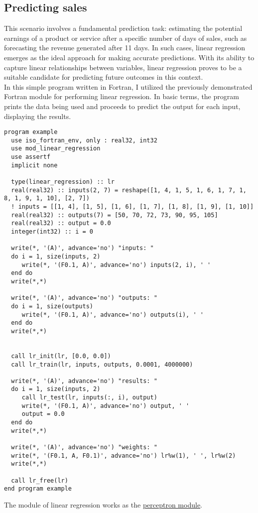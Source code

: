 \subsection{Predicting sales}
This scenario involves a fundamental prediction task: estimating the potential earnings of a product or
service after a specific number of days of sales, such as forecasting the revenue generated after 11 days.
In such cases, linear regression emerges as the ideal approach for making accurate predictions. With its
ability to capture linear relationships between variables, linear regression proves to be a suitable candidate
for predicting future outcomes in this context.\\

In this simple program written in Fortran, I utilized the previously demonstrated Fortran module for performing
linear regression. In basic terms, the program prints the data being used and proceeds to predict the output
for each input, displaying the results.
\begin{lstlisting}
program example
  use iso_fortran_env, only : real32, int32
  use mod_linear_regression
  use assertf
  implicit none

  type(linear_regression) :: lr
  real(real32) :: inputs(2, 7) = reshape([1, 4, 1, 5, 1, 6, 1, 7, 1, 8, 1, 9, 1, 10], [2, 7])
  ! inputs = [[1, 4], [1, 5], [1, 6], [1, 7], [1, 8], [1, 9], [1, 10]]
  real(real32) :: outputs(7) = [50, 70, 72, 73, 90, 95, 105]
  real(real32) :: output = 0.0
  integer(int32) :: i = 0

  write(*, '(A)', advance='no') "inputs: "
  do i = 1, size(inputs, 2)
     write(*, '(F0.1, A)', advance='no') inputs(2, i), ' '
  end do
  write(*,*)

  write(*, '(A)', advance='no') "outputs: "
  do i = 1, size(outputs)
     write(*, '(F0.1, A)', advance='no') outputs(i), ' '
  end do
  write(*,*)
  

  call lr_init(lr, [0.0, 0.0])
  call lr_train(lr, inputs, outputs, 0.0001, 4000000)

  write(*, '(A)', advance='no') "results: "
  do i = 1, size(inputs, 2)
     call lr_test(lr, inputs(:, i), output)
     write(*, '(F0.1, A)', advance='no') output, ' '
     output = 0.0
  end do
  write(*,*)

  write(*, '(A)', advance='no') "weights: "
  write(*, '(F0.1, A, F0.1)', advance='no') lr%w(1), ' ', lr%w(2)
  write(*,*)
  
  call lr_free(lr)
end program example 
\end{lstlisting}
The module of linear regression works as the \hyperref[sec:perceptron-module-fortran]{perceptron module}.

